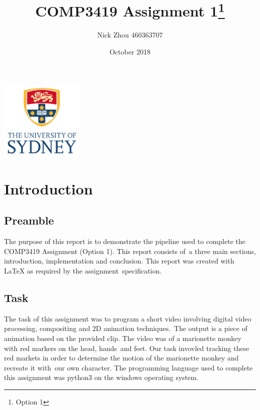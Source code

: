 \documentclass[12pt,a4paper]{article}
\begin{document}
    \begin{titlepage}
        \centering
        \title{COMP3419 Assignment 1\thanks{Option 1}}
        \author{Nick Zhou 460363707}
        \date{October 2018}
        \maketitle
        \centering
        \includegraphics[width=4cm]{usyd}\\[2cm]
    \end{titlepage}

    \begin{tableofcontents}
        \tableofcontents
    \end{tableofcontents}

    \section{Introduction}

      \subsection{Preamble}

      The purpose of this report is to demonstrate the pipeline used to complete the COMP3419 Assignment (Option 1). This report consists of\
      a three main sections, introduction, implementation and conclusion. This report was created with \LaTeX{} as required by the assignment\
      specification.\\

      \subsection{Task}

      The task of this assignment was to program a short video involving digital video processing, compositing and 2D animation techniques.\
      The output is a piece of animation based on the provided clip. The video was of a marionette monkey with red markers on the head, hands\
      and feet. Our task invovled tracking these red markets in order to determine the motion of the marionette monkey and recreate it with\
      our own character. The programming language used to complete this assignment was python3 on the windows operating system.\\
\end{document}
